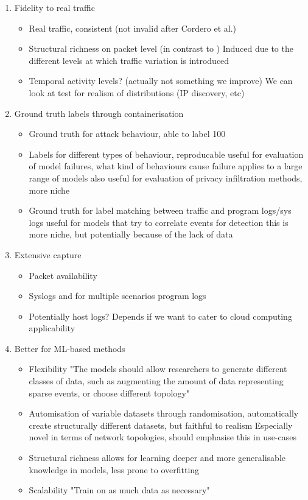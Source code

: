 \documentclass{article}
\begin{document}
\begin{enumerate}
\item Fidelity to real traffic
\begin{itemize}
	\item Real traffic, consistent (not invalid after Cordero et al.)
	\item Structural richness on packet level (in contrast to )
		Induced due to the different levels at which traffic variation is introduced
	\item Temporal activity levels? (actually not something we improve)
			We can look at test for realism of distributions (IP discovery, etc)
\end{itemize}
\item Ground truth labels through containerisation
\begin{itemize}
	\item Ground truth for attack behaviour, able to label 100%
	\item Labels for different types of behaviour, reproducable
		useful for evaluation of model failures, what kind of behaviours cause failure
			applies to a large range of models
		also useful for evaluation of privacy infiltration methods, more niche
	\item Ground truth for label matching between traffic and program logs/sys logs
		useful for models that try to correlate events for detection
			this is more niche, but potentially because of the lack of data
\end{itemize}
\item Extensive capture
\begin{itemize}
	\item Packet availability
	\item Syslogs and for multiple scenarios program logs
	\item Potentially host logs? Depends if we want to cater to cloud computing applicability
\end{itemize}
\item Better for ML-based methods
\begin{itemize}
	\item Flexibility 
		"The models should allow researchers to generate different classes of data, such as augmenting the amount of data representing sparse events, or choose different topology"
	\item Automisation of variable datasets through randomisation, automatically create structurally different datasets, but faithful to realism
		Especially novel in terms of network topologies, should emphasise this in use-cases
	\item Structural richness 
			allows for learning deeper and more generalisable knowledge in models, less prone to overfitting
	\item Scalability
		"Train on as much data as necessary"
\end{itemize}

\end{enumerate}
\end{document}
